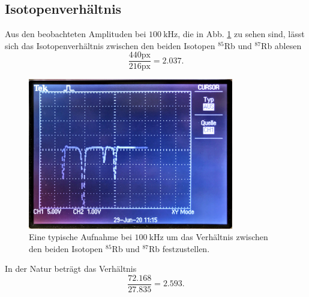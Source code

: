 \subsection{Isotopenverhältnis}
Aus den beobachteten Amplituden bei $\SI{100}{\kilo\hertz}$, die in Abb. \ref{fig:Aufnahme} zu sehen sind, lässt sich das Isotopenverhältnis zwischen den beiden Isotopen $^{85}$Rb und $^{87}$Rb ablesen
\begin{equation*}
    \frac{440\text{px}}{216\text{px}} = \num{2.037}. 
\end{equation*}
\begin{figure}
    \centering
    \includegraphics[width=0.8\textwidth]{fotos/Aufnahme.JPG}
    \caption{Eine typische Aufnahme bei $\SI{100}{\kilo\hertz}$ um das Verhältnis zwischen den beiden Isotopen $^{85}$Rb und $^{87}$Rb festzustellen.}
    \label{fig:Aufnahme}
\end{figure}
In der Natur beträgt das Verhältnis
\begin{equation*}
    \frac{\num{72.168}}{\num{27.835}} = \num{2.593}.
\end{equation*}
